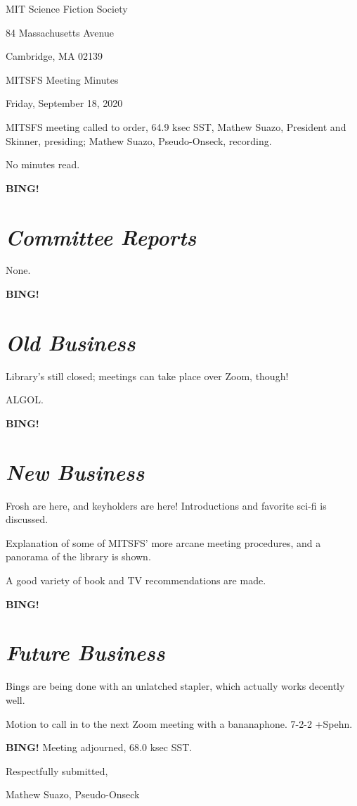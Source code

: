 \documentclass[10pt]{article}
\newcommand{\bing}{{\bf BING!} }
\newcommand{\goto}[1]{\bing \vskip 12pt \section*{{\em{#1}}}}
\newcommand{\skinner}{Mathew Suazo, President and Skinner\xspace}
\newcommand{\onseck}{Mathew Suazo, Pseudo-Onseck\xspace}
\newcommand{\meetingdate}{Friday, September 18, 2020}
\begin{document}
\begin{center}

MIT Science Fiction Society

84 Massachusetts Avenue

Cambridge, MA 02139

\vspace{12pt}

MITSFS Meeting Minutes

\meetingdate

\end{center}

\vspace{18pt}

\setlength{\parskip}{6pt}

\noindent
MITSFS meeting called to order, 64.9 ksec SST,
\skinner, presiding; \onseck, recording.

No minutes read.

\goto{Committee Reports}

None.

\goto{Old Business}

Library's still closed; meetings can take place over Zoom, though!

ALGOL.

\goto{New Business}

Frosh are here, and keyholders are here! Introductions and favorite sci-fi is discussed.

Explanation of some of MITSFS' more arcane meeting procedures, and a panorama of the library is shown.

A good variety of book and TV recommendations are made.

\goto{Future Business}

Bings are being done with an unlatched stapler, which actually works decently well.

Motion to call in to the next Zoom meeting with a bananaphone. 7-2-2 +Spehn.

\bing
\noindent
Meeting adjourned, 68.0 ksec SST.

\vspace{18pt}

\centerline{Respectfully submitted,}
\centerline{\onseck}
\end{document}

